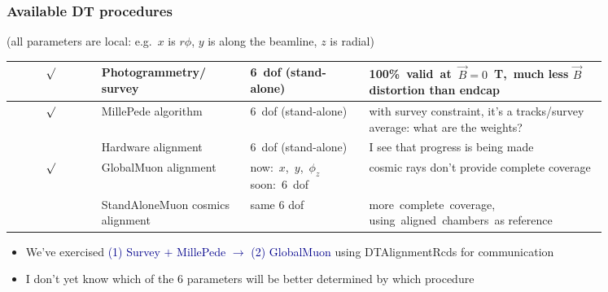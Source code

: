 \documentclass[compress]{beamer}
\begin{document}
\begin{frame}
\frametitle{Available DT procedures}

{\scriptsize (all parameters are local: e.g.\ $x$ is $r\phi$, $y$ is along the beamline, $z$ is radial)}

\renewcommand{\arraystretch}{1.25}

\begin{tabular}{c p{0.25\linewidth} p{0.2\linewidth} p{0.4\linewidth}}
$\surd$ & Photogrammetry/ survey & \mbox{6 dof} \mbox{(stand-alone)} & \mbox{100\% valid at $\vec{B}=0$~T, much} less $\vec{B}$ distortion than endcap \\\hline
$\surd$ & MillePede \mbox{algorithm} & \mbox{6 dof} \mbox{(stand-alone)} & with survey constraint, it's a tracks/survey average: what are the weights? \\\hline
& Hardware \mbox{alignment} & \mbox{6 dof} \mbox{(stand-alone)} & I see that progress is being made \\\hline
$\surd$ & GlobalMuon \mbox{alignment} & \mbox{now: $x$, $y$, $\phi_z$} \mbox{soon: 6 dof} & cosmic rays don't provide complete coverage \\\hline
& StandAloneMuon cosmics alignment & same 6 dof & \mbox{more complete coverage,} \mbox{using aligned chambers as} reference \\
\end{tabular}

\begin{itemize}
\item We've exercised \textcolor{darkblue}{(1) Survey $+$ MillePede $\to$ (2) GlobalMuon} using DTAlignmentRcds for communication
\item I don't yet know which of the 6 parameters will be better determined by which procedure
\end{itemize}
\end{frame}
\end{document}
